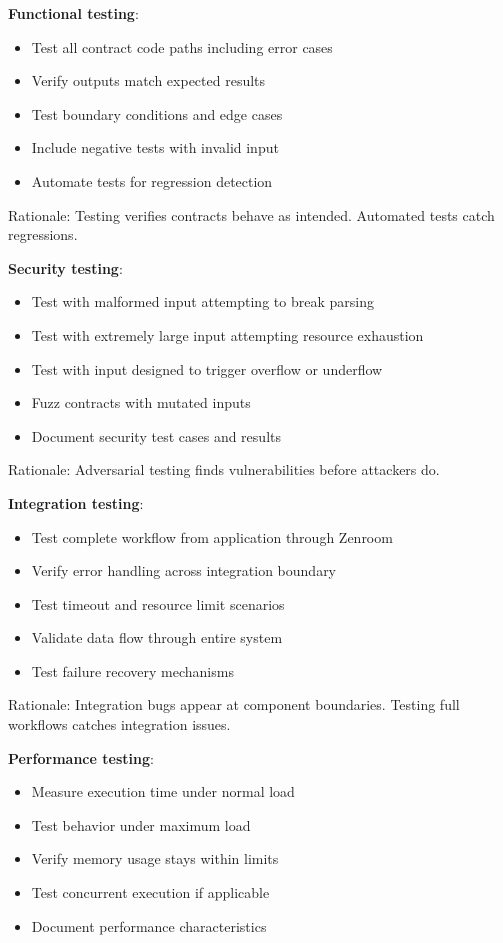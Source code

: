 \textbf{Functional testing}:

\begin{itemize}
\item Test all contract code paths including error cases
\item Verify outputs match expected results
\item Test boundary conditions and edge cases
\item Include negative tests with invalid input
\item Automate tests for regression detection
\end{itemize}

Rationale: Testing verifies contracts behave as intended. Automated
tests catch regressions.

\textbf{Security testing}:

\begin{itemize}
\item Test with malformed input attempting to break parsing
\item Test with extremely large input attempting resource exhaustion
\item Test with input designed to trigger overflow or underflow
\item Fuzz contracts with mutated inputs
\item Document security test cases and results
\end{itemize}

Rationale: Adversarial testing finds vulnerabilities before attackers
do.

\textbf{Integration testing}:

\begin{itemize}
\item Test complete workflow from application through Zenroom
\item Verify error handling across integration boundary
\item Test timeout and resource limit scenarios
\item Validate data flow through entire system
\item Test failure recovery mechanisms
\end{itemize}

Rationale: Integration bugs appear at component boundaries. Testing
full workflows catches integration issues.

\textbf{Performance testing}:

\begin{itemize}
\item Measure execution time under normal load
\item Test behavior under maximum load
\item Verify memory usage stays within limits
\item Test concurrent execution if applicable
\item Document performance characteristics
\end{itemize}

